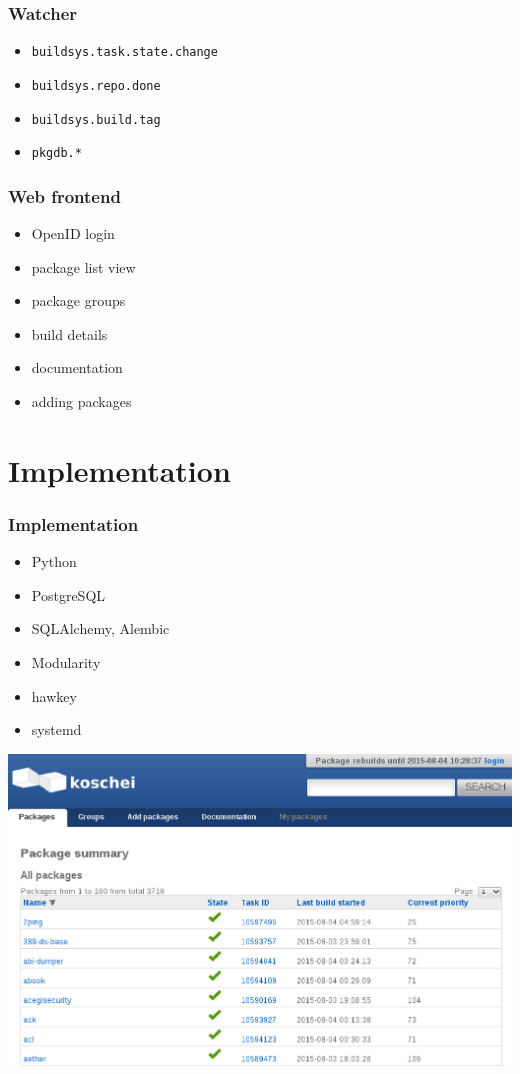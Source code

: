 \documentclass[pdftex,unicode,xcolor=table]{beamer}
\begin{document}
\begin{frame}
  \frametitle{Watcher}
  \begin{itemize}
    \item \tt{buildsys.task.state.change}
    \item \tt{buildsys.repo.done}
    \item \tt{buildsys.build.tag}
    \item \tt{pkgdb.*}
  \end{itemize}
\end{frame}

\begin{frame}
  \frametitle{Web frontend}
  \begin{itemize}
    \item OpenID login
    \item package list view
    \item package groups
    \item build details
    \item documentation
    \item adding packages
  \end{itemize}
\end{frame}

\section{Implementation}
\begin{frame}
  \frametitle{Implementation}
  \begin{itemize}
    \item Python
    \item PostgreSQL
    \item SQLAlchemy, Alembic
    \item Modularity
    \item hawkey
    \item systemd
  \end{itemize}
\end{frame}

\begin{frame}[fragile]
  \begin{center}
    \includegraphics[scale=0.48]{koschei-frontend-1.eps}
  \end{center}
\end{frame}
\end{document}
